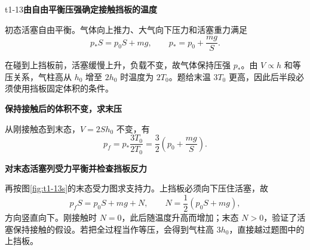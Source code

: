 \begin{drillsolution}{t1-13}\textbf{由自由平衡压强确定接触挡板的温度}\par\nobreak
初态活塞自由平衡。气体向上推力、大气向下压力和活塞重力满足
\[p_*S=p_0S+mg,\qquad p_*=p_0+\frac{mg}{S}.\]



在碰到上挡板前，活塞缓慢上升，负载不变，故气体保持压强 $p_*$。由 $V\propto h$ 和等压关系，气柱高从 $h_0$ 增至 $2h_0$ 时温度为 $2T_0$。题给末温 $3T_0$ 更高，因此后半段必须使用挡板固定体积的条件。



\par\medskip{}\noindent\textbf{保持接触后的体积不变，求末压}\par\nobreak
从刚接触态到末态，$V=2Sh_0$ 不变，有
\[\boxed{p_f=p_*\frac{3T_0}{2T_0}=\frac32\left(p_0+\frac{mg}{S}\right)}.\]


\par\medskip{}\noindent\textbf{对末态活塞列受力平衡并检查挡板反力}\par\nobreak
再按图\ref{fig:t1-13s}的末态受力图求支持力。上挡板必须向下压住活塞，故
\[p_fS=p_0S+mg+N,\qquad
\boxed{N=\frac12(p_0S+mg)},\]
方向竖直向下。刚接触时 $N=0$，此后随温度升高而增加；末态 $N>0$，验证了活塞保持接触的假设。若把全过程当作等压，会得到气柱高 $3h_0$，直接越过题图中的上挡板。
\end{drillsolution}
